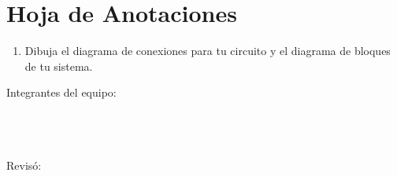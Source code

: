 
\clearpage
\section{Hoja de Anotaciones}

	\begin{enumerate}
		\item Dibuja el diagrama de conexiones para tu circuito y el diagrama de bloques de tu sistema. \newline \newline \newline \newline \newline \newline \newline \newline \newline \newline \newline \newline \newline \newline \newline \newline \newline \newline \newline \newline \newline \newline \newline \newline \newline \newline \newline \newline
	\end{enumerate}

	Integrantes del equipo: \\[0.2cm]
	\horrule{0.5pt} \\[0.2cm] %
	\horrule{0.5pt} \\[0.2cm] %
	\horrule{0.5pt} \\[0.2cm] %
	\horrule{0.5pt} %

	Revisó: \\[0.2cm]
	\horrule{0.5pt} \\%



